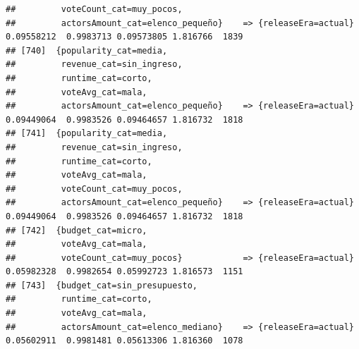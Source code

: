 \documentclass[
]{article}
\begin{document}
\begin{verbatim}
##         voteCount_cat=muy_pocos,                                                                                                
##         actorsAmount_cat=elenco_pequeño}    => {releaseEra=actual}               0.09558212  0.9983713 0.09573805 1.816766  1839
## [740]  {popularity_cat=media,                                                                                                   
##         revenue_cat=sin_ingreso,                                                                                                
##         runtime_cat=corto,                                                                                                      
##         voteAvg_cat=mala,                                                                                                       
##         actorsAmount_cat=elenco_pequeño}    => {releaseEra=actual}               0.09449064  0.9983526 0.09464657 1.816732  1818
## [741]  {popularity_cat=media,                                                                                                   
##         revenue_cat=sin_ingreso,                                                                                                
##         runtime_cat=corto,                                                                                                      
##         voteAvg_cat=mala,                                                                                                       
##         voteCount_cat=muy_pocos,                                                                                                
##         actorsAmount_cat=elenco_pequeño}    => {releaseEra=actual}               0.09449064  0.9983526 0.09464657 1.816732  1818
## [742]  {budget_cat=micro,                                                                                                       
##         voteAvg_cat=mala,                                                                                                       
##         voteCount_cat=muy_pocos}            => {releaseEra=actual}               0.05982328  0.9982654 0.05992723 1.816573  1151
## [743]  {budget_cat=sin_presupuesto,                                                                                             
##         runtime_cat=corto,                                                                                                      
##         voteAvg_cat=mala,                                                                                                       
##         actorsAmount_cat=elenco_mediano}    => {releaseEra=actual}               0.05602911  0.9981481 0.05613306 1.816360  1078

\end{verbatim}
\end{document}
